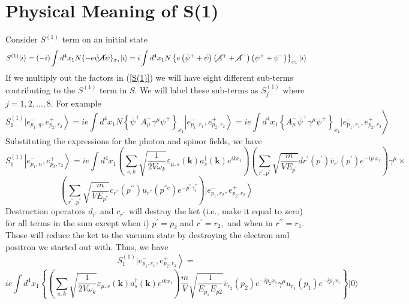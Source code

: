 \section{Physical Meaning of S(1)}
Consider $S^{(1)}$ term on an initial state
\begin{equation}
S^{(1)}|i\rangle=(-i) \int d^{4} x_{1} N\{-e \bar{\psi} \cancel{A} \psi\}_{x_{1}}|i\rangle= i \int d^{4} x_{1} N\left\{e\left(\bar{\psi}^{+}+\bar{\psi}\right)\left(\cancel{A}^{+}+\cancel{A}^{-}\right)\left(\psi^{+}+\psi^{-}\right)\right\}_{x_{1}}|i\rangle
\label{S(1)}
\end{equation}
If we multiply out the factors in (\ref{S(1)}) we will have eight different sub-terms contributing to the
$S^{(1)}$ term in $S .$ We will label these sub-terms as $S_{j}^{(1)}$ where $j=1,2, \ldots, 8$. For example
$$
\left.S_{1}^{(1)} | e_{p_{1}, q}^{-}, e_{p_{2}, r_{2}}^{+}\right\rangle=i e \int d^{4} x_{1} N\left\{\bar{\psi}^{+} A^-_{\mu} \gamma^{\mu} \psi^{+}\right\}_{x_{1}}\left|e_{p_{1}, r_{1}}^{-}, e_{p_{2}, r_{2}}^{+}\right\rangle\left.=i e \int d^{4} x_{1}\left\{A_{\mu}^{-} \bar{\psi}^{+} \gamma^{\mu} \psi^{+}\right\}_{x_{1}} | e_{\mathrm{p}_{1}, r_{1}}^{-}, e_{p_{2}, r_{2}}^{+}\right\rangle
$$
Substituting the expressions for the photon and spinor fields, we have
$$
S_{1}^{(1)}\left|e_{p_{1}, n}^{-}, e_{p_{2}, r_{2}}^{+}\right\rangle= i e \int d^{4} x_{1}\left(\sum_{s, k} \sqrt{\frac{1}{2 V{\omega_{k}}}} \varepsilon_{\mu, s}(\mathbf{k}) a_{s}^{\dagger}(\mathbf{k}) e^{i kx_1}\right)\left(\sum_{r^{\prime}, p^{\prime}} \sqrt{\frac{m}{V E_{p^{\prime}}}} d r^{\prime}\left(p^{\prime}\right) \bar{v}_{r^{\prime}}\left(p^{\prime}\right) e^{-i p^{\prime} x_{1}}\right) \gamma^{\mu}\times
$$
$$
\left(\sum_{r^{''}, p^{''}} \sqrt{\frac{m}{V E_{p^{''}}}} c_{r^{''}}\left(p^{\prime \prime}\right) u_{r^{''}}\left(p^{''e}\right) e^{-p^{''} \gamma_{1}^{''}}\right)\left.| e_{p_{1}, r_{2}}^{-}, e^{+}_{ p_{2}, r_{2}}\right\rangle
$$
Destruction operators $d_{r^{\prime}}$ and $c_{r^{\prime \prime}}$ will destroy the ket (i.e., make it equal to zero) for all terms in the sum except when i) $p^{\prime}=p_{2}$ and $r^{\prime}=r_{2},$ and when in $r^{\prime \prime}=r_{1}$. Those will reduce the ket to the vacuum state by destroying the electron and positron we started out with. Thus, we have 
$$
\left.S_{1}^{(1)} | e_{p_{1}, r_{1}}^{-}, e_{p_{2}, r_{2}}^{+}\right\rangle=
$$
$$
ie  \int d^{4} x_{1}\left\{\left(\sum_{s, k} \sqrt{\frac{1}{2 V{\omega_{k}}}} \varepsilon_{\mu, s}(\mathbf{k}) a_{s}^{\dagger}(\mathbf{k}) e^{i kx_1}\right)\right.\left.\frac{m}{V} \sqrt{\frac{1}{E_{p_{1}} E_{p 2}}} \bar{v}_{r_{2}}\left(p_{2}\right) e^{-i p_{2} x_{1}} \gamma^{\mu} u_{r_1}\left(p_{1}\right) e^{-i p_{1} x_{1}}\right\}|0\rangle
$$

